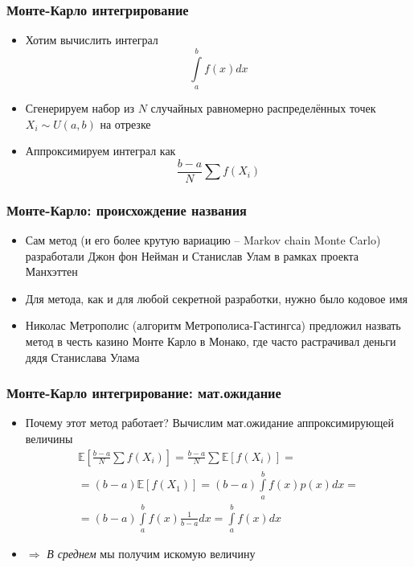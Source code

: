 \documentclass[10pt]{beamer}
\begin{document}
\begin{frame}[fragile]
\frametitle{Монте-Карло интегрирование}
\begin{itemize}
\item Хотим вычислить интеграл
\begin{equation*}
\int\limits_a^b f(x)dx
\end{equation*}
\pause
\item Сгенерируем набор из \begin{math}N\end{math} случайных равномерно распределённых точек \begin{math}X_i \sim U(a,b)\end{math} на отрезке \begin{math}[a, b]\end{math}
\pause
\item Аппроксимируем интеграл как
\begin{equation*}
\frac{b-a}{N}\sum f(X_i)
\end{equation*}
\end{itemize}
\end{frame}

\begin{frame}[fragile]
\frametitle{Монте-Карло: происхождение названия}
\begin{itemize}
\item Сам метод (и его более крутую вариацию -- Markov chain Monte Carlo) разработали Джон фон Нейман и Станислав Улам в рамках проекта Манхэттен
\pause
\item Для метода, как и для любой секретной разработки, нужно было кодовое имя
\pause
\item Николас Метрополис (алгоритм Метрополиса-Гастингса) предложил назвать метод в честь казино Монте Карло в Монако, где часто растрачивал деньги дядя Станислава Улама
\end{itemize}
\end{frame}

\begin{frame}[fragile]
\frametitle{Монте-Карло интегрирование: мат.ожидание}
\begin{itemize}
\item Почему этот метод работает? \pause Вычислим мат.ожидание аппроксимирующей величины
\begin{gather*}
\mathbb{E}\left[\frac{b-a}{N}\sum f(X_i)\right] = \frac{b-a}{N}\sum\mathbb{E}[f(X_i)] = \\
= (b-a)\mathbb{E}[f(X_1)] = (b-a)\int\limits_a^b f(x)p(x)dx = \\
= (b-a)\int\limits_a^b f(x)\frac{1}{b-a}dx = \int\limits_a^b f(x)dx
\end{gather*}
\pause
\item \begin{math}\Longrightarrow\end{math} \textit{В среднем} мы получим искомую величину
\end{itemize}
\end{frame}
\end{document}
